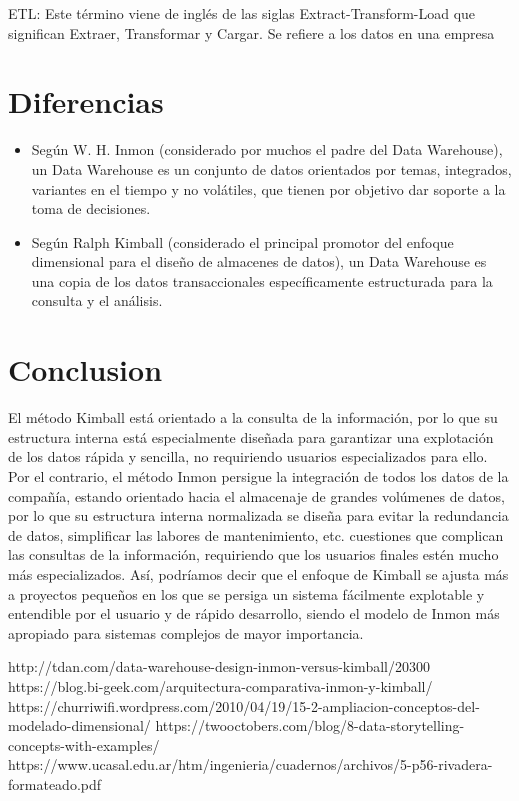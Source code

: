 \documentclass[preprint,12pt]{elsarticle}
\begin{document}
ETL: Este término viene de inglés de las siglas Extract-Transform-Load que significan Extraer, Transformar y Cargar. Se refiere a los datos en una empresa
\section{Diferencias}
\begin{itemize}
\item Según W. H. Inmon (considerado por muchos el padre del Data Warehouse), un Data Warehouse es un conjunto de datos orientados por temas, integrados, variantes en el tiempo y no volátiles, que tienen por objetivo dar soporte a la toma de decisiones.
\item Según Ralph Kimball (considerado el principal promotor del enfoque dimensional para el diseño de almacenes de datos), un Data Warehouse es una copia de los datos transaccionales específicamente estructurada para la consulta y el análisis.
\end{itemize}

\section{Conclusion}
El método Kimball está orientado a la consulta de la información, por lo que su estructura interna está especialmente diseñada para garantizar una explotación de los datos rápida y sencilla, no requiriendo usuarios especializados para ello. Por el contrario, el método Inmon persigue la integración de todos los datos de la compañía, estando orientado hacia el almacenaje de grandes volúmenes de datos, por lo que su estructura interna normalizada se diseña para evitar la redundancia de datos, simplificar las labores de mantenimiento, etc. cuestiones que complican las consultas de la información, requiriendo que los usuarios finales estén mucho más especializados.
Así, podríamos decir que el enfoque de Kimball se ajusta más a proyectos pequeños en los que se persiga un sistema fácilmente explotable y entendible por el usuario y de rápido desarrollo, siendo el modelo de Inmon más apropiado para sistemas complejos de mayor importancia.

	
	

	
	
	\newpage
	
	   \begin{thebibliography}{0}
                  http://tdan.com/data-warehouse-design-inmon-versus-kimball/20300
                   https://blog.bi-geek.com/arquitectura-comparativa-inmon-y-kimball/
                   https://churriwifi.wordpress.com/2010/04/19/15-2-ampliacion-conceptos-del-modelado-dimensional/
                     https://twooctobers.com/blog/8-data-storytelling-concepts-with-examples/
                   https://www.ucasal.edu.ar/htm/ingenieria/cuadernos/archivos/5-p56-rivadera-formateado.pdf

         \end{thebibliography}
	
\end{document}
